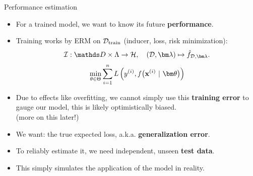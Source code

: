 \documentclass[11pt,compress,t,notes=noshow, xcolor=table]{beamer}
\begin{document}



\begin{vbframe}{Performance estimation}

\begin{itemize}
  \item For a trained model, we want to know its future \textbf{performance}.
  \item Training works by ERM on $\mathcal{D}_{\text{train}}$ (inducer, loss, risk minimization):
  $$\ind: \preimageInducerShort \rightarrow \Hspace, \quad (\D, \lamv)
  \mapsto \fhDlam.$$
  $$ \min_{\theta \in \Theta} \sumin \Lxyit $$ 
  \item Due to effects like overfitting, we cannot simply use this \textbf{training error}
      to gauge our model, this is likely optimistically biased.\\ 
      (more on this later!)
  \item We want: the true expected loss, a.k.a. \textbf{generalization error}.
  \item To reliably estimate it, we need independent, unseen \textbf{test data}. 
  \item This simply simulates the application of the model in reality.    
\end{itemize}
\end{vbframe}
\end{document}
